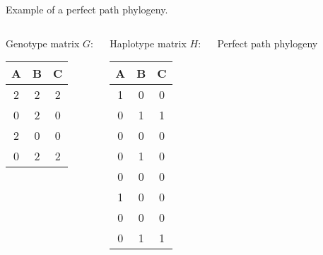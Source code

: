 \documentclass[aspectratio=169]{beamer}
\begin{document}
\begin{frame}{Example of a perfect path phylogeny.}
  \begin{columns}[t]
    \begin{exampleblock}{Genotype matrix}
      $G\colon$
      \begin{tabular}{ccc}
        A & B & C \\\hline
        2 & 2 & 2 \\
        0 & 2 & 0 \\
        2 & 0 & 0 \\
        0 & 2 & 2 
      \end{tabular}
    \end{exampleblock}

    \begin{exampleblock}{Haplotype matrix}
      $H\colon$
      \begin{tabular}{ccc}
        A & B & C \\\hline
        1 & 0 & 0 \\
        0 & 1 & 1 \\
        0 & 0 & 0 \\
        0 & 1 & 0 \\
        0 & 0 & 0 \\
        1 & 0 & 0 \\
        0 & 0 & 0 \\
        0 & 1 & 1 
      \end{tabular}
    \end{exampleblock}

    \begin{exampleblock}{Perfect path phylogeny}
      \begin{center}
      \end{center}
    \end{exampleblock}
  \end{columns}
\end{frame}
\end{document}
